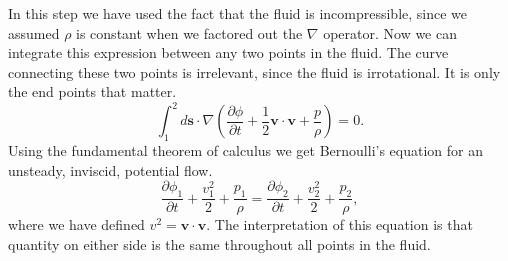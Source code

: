 \documentclass[12pt, letter]{report}
\begin{document}
In this step we have used the fact that the fluid is incompressible, since we assumed $\rho$ is constant when we factored out the $\nabla$ operator. Now we can integrate this expression between any two points in the fluid. The curve connecting these two points is irrelevant, since the fluid is irrotational. It is only the end points that matter.
\begin{equation}
\int_1^2 d\textbf{s} \cdot \nabla \left( \frac{\partial  \phi}{\partial t} +  \frac{1}{2}  \textbf{v} \cdot \textbf{v} + \frac{p}{\rho} \right) = 0.
\end{equation}
Using the fundamental theorem of calculus we get Bernoulli's equation for an unsteady, inviscid, potential flow.
\begin{equation}
\frac{\partial  \phi_1}{\partial t} +  \frac{v_1^2}{2} + \frac{p_1}{\rho}=\frac{\partial  \phi_2}{\partial t} +  \frac{v_2^2}{2} + \frac{p_2}{\rho},
\end{equation}
where we have defined $v^2 = \textbf{v} \cdot \textbf{v}$. The interpretation of this equation is that quantity on either side is the same throughout all points in the fluid.
\end{document}
